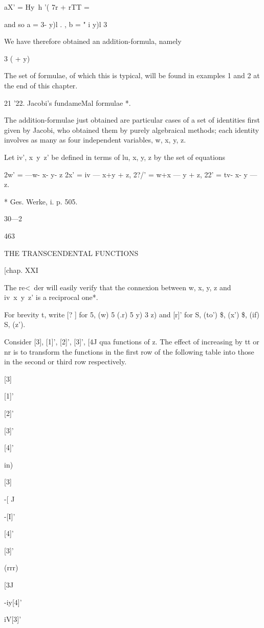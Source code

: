 aX' = Hy\ h '( 7r + rTT = %

and so a = 3- y)l . , b = " i y)l 3\

We have therefore obtained an addition-formula, namely

 3 ( + y) %

The set of formulae, of which this is typical, will be found in
examples 1 and 2 at the end of this chapter.

21 '22. Jacobi's fundameMal formulae *.

The addition-formulae just obtained are particular cases of a set of
identities first given by Jacobi, who obtained them by purely
algebraical methods; each identity involves as many as four
independent variables, w, x, y, z.

Let iv', x\ y\ z' be defined in terms of lu, x, y, z by the set of
equations

2w' = —w- x- y- z 2x' = iv — x+y + z, 2?/' = w+x — y + z, 22' = tv- x-
y — z.

* Ges. Werke, i. p. 505.

30—2

463

THE TRANSCENDENTAL FUNCTIONS

[chap. XXI

The re<\ der will easily verify that the connexion between w, x, y, z
and iv\ x\ y\ z' is a reciprocal one*.

For brevity t, write [? ] for 5, (w) 5 (.r) 5 y) 3 z) and [r]' for S,
(to') \$, (x') \$, (if) S, (z').

Consider [3], [1]', [2]', [3]', [4J qua functions of z. The effect of
increasing by tt or nr is to transform the functions in the first row
of the following table into those in the second or third row
respectively.

[3]

[1]'

[2]'

[3]'

[4]'

in)

[3]

-[ J

-[I]'

[4]'

[3]'

(rrr)

 [3J

-iy[4]'

iV[3]'

